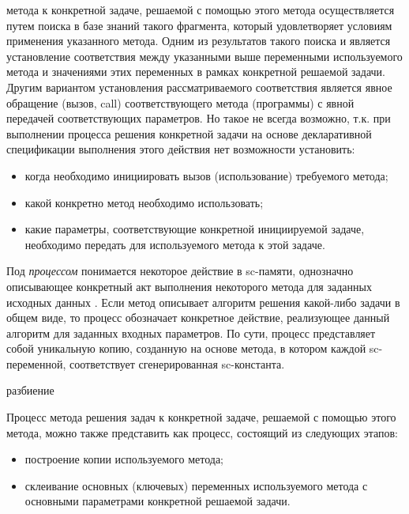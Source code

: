 метода к конкретной задаче, решаемой с помощью этого метода осуществляется путем поиска в базе знаний такого фрагмента, который удовлетворяет условиям применения указанного метода. Одним из результатов такого поиска и является установление соответствия между указанными выше переменными используемого метода и значениями этих переменных в рамках конкретной решаемой задачи. Другим вариантом установления рассматриваемого соответствия является явное обращение (вызов, call) соответствующего метода (программы) с явной передачей соответствующих параметров. Но такое не всегда возможно, т.к. при выполнении процесса решения конкретной задачи на основе декларативной спецификации выполнения этого действия нет возможности установить:
\begin{itemize}
    \item когда необходимо инициировать вызов (использование) требуемого метода;
    \item какой конкретно метод необходимо использовать;
    \item какие параметры, соответствующие конкретной инициируемой задаче, необходимо передать для  используемого метода к этой задаче.
\end{itemize}

Под \textit{процессом} понимается некоторое действие в sc-памяти, однозначно описывающее конкретный акт выполнения некоторого метода для заданных исходных данных \cite{Deikstra1978}. Если метод описывает алгоритм решения какой-либо задачи в общем виде, то процесс обозначает конкретное действие, реализующее данный алгоритм для заданных входных параметров. По сути, процесс представляет собой уникальную копию, созданную на основе метода, в котором каждой sc-переменной, соответствует сгенерированная sc-константа.

\begin{SCn}
\begin{scnrelfromset}{разбиение}
\end{scnrelfromset}
\end{SCn}

Процесс  метода решения задач к конкретной задаче, решаемой с помощью этого метода, можно также представить как процесс, состоящий из следующих этапов:
\begin{itemize}
    \item построение копии используемого метода;
    \item склеивание основных (ключевых) переменных используемого метода с основными параметрами конкретной решаемой задачи.
\end{itemize}

